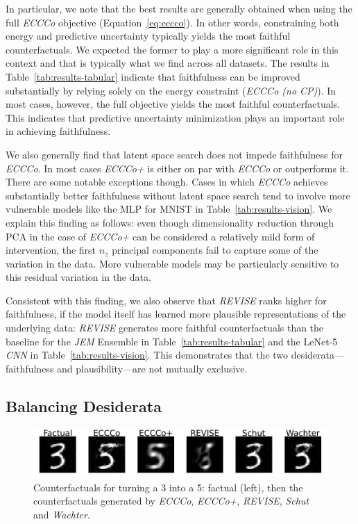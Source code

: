 \documentclass[letterpaper]{article} %
\begin{document}
In particular, we note that the best results are generally obtained when using the full \textit{ECCCo} objective (Equation~\ref{eq:eccco}). In other words, constraining both energy and predictive uncertainty typically yields the most faithful counterfactuals. We expected the former to play a more significant role in this context and that is typically what we find across all datasets. The results in Table~\ref{tab:results-tabular} indicate that faithfulness can be improved substantially by relying solely on the energy constraint (\textit{ECCCo (no CP)}). In most cases, however, the full objective yields the most faithful counterfactuals. This indicates that predictive uncertainty minimization plays an important role in achieving faithfulness. 

We also generally find that latent space search does not impede faithfulness for \textit{ECCCo}. In most cases \textit{ECCCo+} is either on par with \textit{ECCCo} or outperforms it. There are some notable exceptions though. Cases in which \textit{ECCCo} achieves substantially better faithfulness without latent space search tend to involve more vulnerable models like the MLP for MNIST in Table~\ref{tab:results-vision}. We explain this finding as follows: even though dimensionality reduction through PCA in the case of \textit{ECCCo+} can be considered a relatively mild form of intervention, the first $n_z$ principal components fail to capture some of the variation in the data. More vulnerable models may be particularly sensitive to this residual variation in the data. 

Consistent with this finding, we also observe that \textit{REVISE} ranks higher for faithfulness, if the model itself has learned more plausible representations of the underlying data: \textit{REVISE} generates more faithful counterfactuals than the baseline for the \textit{JEM} Ensemble in Table~\ref{tab:results-tabular} and the LeNet-5 \textit{CNN} in Table~\ref{tab:results-vision}. This demonstrates that the two desiderata---faithfulness and plausibility---are not mutually exclusive.

\subsection{Balancing Desiderata}

\begin{figure}
  \centering
  \includegraphics[width=1.0\linewidth]{figures/mnist_benchmark.png}
  \caption{Counterfactuals for turning a 3 into a 5: factual (left), then the counterfactuals generated by \textit{ECCCo}, \textit{ECCCo+}, \textit{REVISE}, \textit{Schut} and \textit{Wachter}.}\label{fig:mnist-bmk}
\end{figure}
\end{document}

